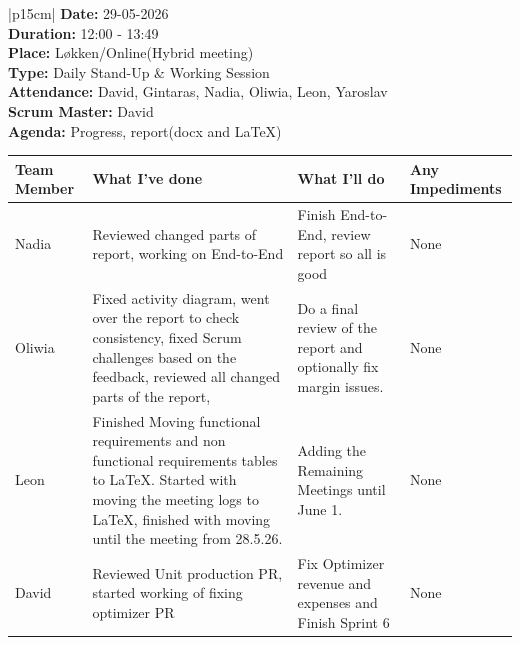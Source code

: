 \begin{table}[H]
    \centering
    \begin{tabular}{|p{15cm}|}   
        \hline
        \textbf{Date:}  29-05-2026 \\
        \textbf{Duration:}  12:00 - 13:49 \\
        \textbf{Place:}  Løkken/Online(Hybrid meeting) \\
        \textbf{Type:} Daily Stand-Up \& Working Session \\
        \textbf{Attendance:}  David, Gintaras, Nadia, Oliwia, Leon, Yaroslav\\
        \textbf{Scrum Master:}  David \\
        \textbf{Agenda:} Progress, report(docx and LaTeX)
        \begin{table}[H]
            \begin{tabular}{|p{1.75cm}|p{4cm}|p{4cm}|p{4cm}|}
                \hline
                \cellcolor[HTML]{BFBFBF}  \textbf{Team Member} & \cellcolor[HTML]{BFBFBF}  \textbf{What I've done} & \cellcolor[HTML]{BFBFBF}  \textbf{What I'll do} & \cellcolor[HTML]{BFBFBF}  \textbf{Any Impediments}\\
                \hline
                \cellcolor[HTML]{d4d4d4} Nadia & Reviewed changed parts of report, working on End-to-End & Finish End-to-End, review report so all is good & None \\
                \hline
                \cellcolor[HTML]{d4d4d4} Oliwia & Fixed activity diagram, went over the report to check consistency, fixed Scrum challenges based on the feedback, reviewed all changed parts of the report, & Do a final review of the report and optionally fix margin issues. & None \\
                \hline
                \cellcolor[HTML]{d4d4d4} Leon & Finished Moving functional requirements and non functional requirements tables to LaTeX. Started with moving the meeting logs to LaTeX, finished with moving until the meeting from 28.5.26. & Adding the Remaining Meetings until June 1. & None \\
                \hline
                \cellcolor[HTML]{d4d4d4} David & Reviewed Unit production PR, started working of fixing optimizer PR & Fix Optimizer revenue and expenses and Finish Sprint 6 & None \\
                \hline
            \end{tabular}
        \end{table} \\
        \hline
    \end{tabular}
\end{table}

